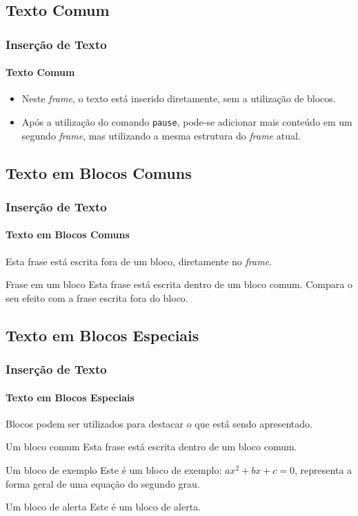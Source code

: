 \documentclass[10pt,aspectratio=169]{beamer}
\begin{document}
\subsection{Texto Comum}

\begin{frame}
\frametitle{Inserção de Texto}
\framesubtitle{Texto Comum}
\begin{itemize}
	\item Neste \textit{frame}, o texto está inserido diretamente, sem a utilização de blocos.
	\pause
	\item Após a utilização do comando {\tt pause}, pode-se adicionar mais conteúdo em um segundo \textit{frame}, mas utilizando a mesma estrutura do \textit{frame} atual.
\end{itemize}
\end{frame}

\subsection{Texto em Blocos Comuns}

\begin{frame}
\frametitle{Inserção de Texto}
\framesubtitle{Texto em Blocos Comuns}
Esta frase está escrita fora de um bloco, diretamente no \textit{frame}.
\begin{block}{Frase em um bloco}
	Esta frase está escrita dentro de um bloco comum. Compara o seu efeito com a frase escrita fora do bloco.
\end{block}
\end{frame}

\subsection{Texto em Blocos Especiais}

\begin{frame}
\frametitle{Inserção de Texto}
\framesubtitle{Texto em Blocos Especiais}
Blocos podem ser utilizados para destacar o que está sendo apresentado.
\begin{block}{Um bloco comum}
	Esta frase está escrita dentro de um bloco comum.
\end{block}
\pause
\begin{exampleblock}{Um bloco de exemplo}
	Este é um bloco de exemplo: $ax^2 + bx + c = 0$, representa a forma geral de uma equação do segundo grau.
\end{exampleblock}
\pause
\begin{alertblock}{Um bloco de alerta}
	Este é um bloco de alerta.
\end{alertblock}
\end{frame}
\end{document}
